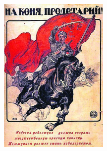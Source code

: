 \documentclass[12pt, a4paper]{article}
\begin{document}
\begin{center}
\includegraphics[height=3in]{figures/proletarii.jpg}
\end{center}
\end{document}
